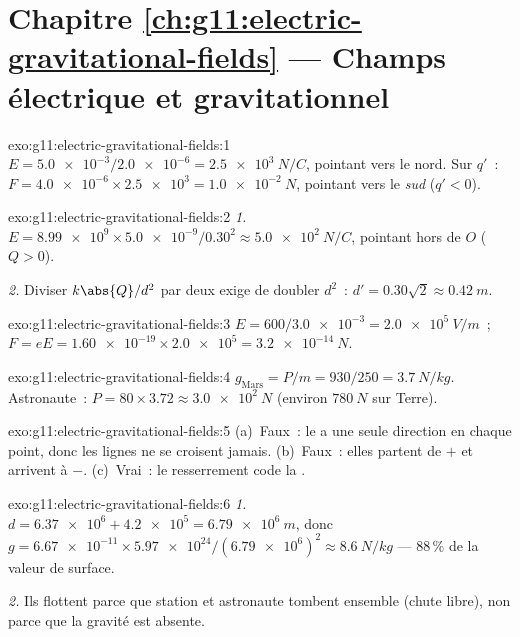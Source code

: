 \section*{Chapitre \ref{ch:g11:electric-gravitational-fields} --- Champs électrique et gravitationnel}

\begin{solution}{exo:g11:electric-gravitational-fields:1}
$E = \num{5.0e-3} / \num{2.0e-6} = \qty{2.5e3}{N/C}$, pointant vers le
nord. Sur $q'$~: $F = \num{4.0e-6} \times \num{2.5e3} = \qty{1.0e-2}{N}$,
pointant vers le \emph{sud} ($q' < 0$).
\end{solution}

\begin{solution}{exo:g11:electric-gravitational-fields:2}
\emph{1.} $E = \num{8.99e9} \times \num{5.0e-9} / 0.30^2
\approx \qty{5.0e2}{N/C}$, pointant hors de $O$ ($Q > 0$).

\emph{2.} Diviser $k\abs{Q}/d^2$ par deux exige de doubler $d^2$~:
$d' = 0.30\sqrt{2} \approx \qty{0.42}{m}$.
\end{solution}

\begin{solution}{exo:g11:electric-gravitational-fields:3}
$E = 600 / \num{3.0e-3} = \qty{2.0e5}{V/m}$~;
$F = eE = \num{1.60e-19} \times \num{2.0e5} = \qty{3.2e-14}{N}$.
\end{solution}

\begin{solution}{exo:g11:electric-gravitational-fields:4}
$g_{\text{Mars}} = P/m = 930/250 = \qty{3.7}{N/kg}$. Astronaute~:
$P = 80 \times 3.72 \approx \qty{3.0e2}{N}$ (environ $\qty{780}{N}$ sur
Terre).
\end{solution}

\begin{solution}{exo:g11:electric-gravitational-fields:5}
(a)~Faux~: le  a une seule
direction en chaque point, donc les lignes ne se croisent jamais.
(b)~Faux~: elles partent de $+$ et arrivent à $-$. (c)~Vrai~: le
resserrement code la .
\end{solution}

\begin{solution}{exo:g11:electric-gravitational-fields:6}
\emph{1.} $d = \num{6.37e6} + \num{4.2e5} = \qty{6.79e6}{m}$, donc
$g = \num{6.67e-11} \times \num{5.97e24} / (\num{6.79e6})^2
\approx \qty{8.6}{N/kg}$ --- $88\,\%$ de la valeur de surface.

\emph{2.} Ils flottent parce que station et astronaute tombent ensemble
(chute libre), non parce que la gravité est absente.
\end{solution}

